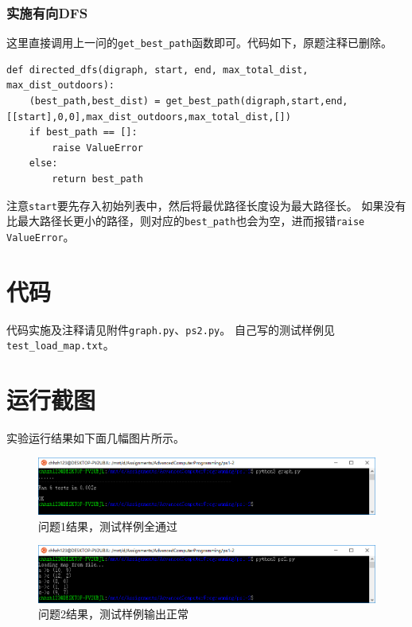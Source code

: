 \documentclass[logo,reportComp]{thesis}
\begin{document}
\subsubsection{实施有向DFS}
这里直接调用上一问的\verb'get_best_path'函数即可。代码如下，原题注释已删除。
\begin{lstlisting}
def directed_dfs(digraph, start, end, max_total_dist, max_dist_outdoors):
    (best_path,best_dist) = get_best_path(digraph,start,end,[[start],0,0],max_dist_outdoors,max_total_dist,[])
    if best_path == []:
        raise ValueError
    else:
        return best_path
\end{lstlisting}

注意\verb'start'要先存入初始列表中，然后将最优路径长度设为最大路径长。
如果没有比最大路径长更小的路径，则对应的\verb'best_path'也会为空，进而报错\verb'raise ValueError'。

\section{代码}
代码实施及注释请见附件\verb'graph.py'、\verb'ps2.py'。
自己写的测试样例见\verb'test_load_map.txt'。

\section{运行截图}
实验运行结果如下面几幅图片所示。
\begin{figure}[H]
\centering
\includegraphics[width=\linewidth]{fig/graph.PNG}
\caption{问题1结果，测试样例全通过}
\label{fig:graph}
\end{figure}

\begin{figure}[H]
\centering
\includegraphics[width=\linewidth]{fig/test.PNG}
\caption{问题2结果，测试样例输出正常}
\label{fig:test}
\end{figure}
\end{document}
